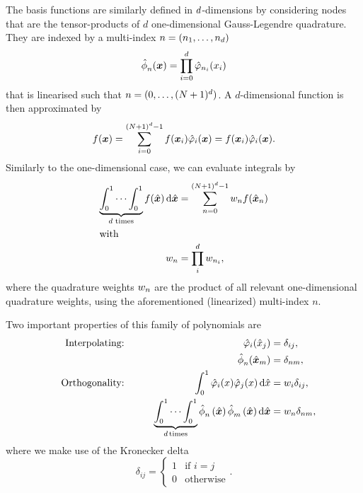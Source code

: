 The basis functions are similarly defined in $\dimensions$-dimensions by considering nodes that are the tensor-products of $d$ one-dimensional Gauss-Legendre quadrature.
They are indexed by a multi-index $n = (n_1, \ldots, n_\dimensions)$
\begin{equation}
  \label{eq:basis-space}
  \sbasisRef[][n] (\bm{x}) = \prod_{i=0}^{\dimensions} \lagrangeRef[n_i] (x_i)
\end{equation}
that is linearised such that $n = (0, \ldots, \sbasisSize)$.
A $d$-dimensional function is then approximated by
\begin{equation}
  \label{eq:lagrange-expansion}
  f(\bm{x}) = \sum_{i = 0}^{\sbasisSize - 1} f(\bm{x}_i) \lagrangeRef[i](\bm{x}) = f(\bm{x}_i) \lagrangeRef[i](\bm{x}).
\end{equation}
Similarly to the one-dimensional case, we can evaluate integrals by
\begin{align}
  \label{eq:quadrature}
  \underbrace{\int_0^1 \cdots \int_0^1}_{\dimensions \text{ times}} f(\hat{\bm{x}}) \dd{\hat{\bm{x}}} &=
 \sum_{n=0}^{\sbasisSize-1} \quadWeight[n] f(\quadNodeNd[n]) \\
  \intertext{with}
  \quadWeight[n] &= \prod_{i}^{d} \quadWeight[n_i],
\end{align}
where the quadrature weights $\quadWeight[n]$ are the product of all relevant one-dimensional quadrature weights, using the aforementioned (linearized) multi-index $n$.

Two important properties of this family of polynomials are
  \begin{alignat}{10}
    \label{eq:basis-interpolating}
&& \text{Interpolating:} \qquad && \lagrangeRef[i] (\quadNode[j]) &= \delta_{ij},\\
&& \qquad && \sbasisRef[][n] (\quadNodeNd[m]) &= \delta_{nm}, \notag\\
\label{eq:basis-orthogonality}
&& \text{Orthogonality:} \qquad && \int_0^1 \lagrangeRef[i](x) \lagrangeRef[j](x) \dd{\hat{x}} &= \quadWeight[i] \delta_{ij},\\
&& \qquad &&
\underbrace{\int_0^1 \cdots \int_0^1}_{d \,\text{times}}
\sbasisRef[][n] \left( \hat{\bm{x}} \right)
\sbasisRef[][m] \left( \hat{\bm{x}} \right) \dd{\hat{\bm{x}}}
&= \quadWeight[n] \delta_{nm}, \notag
    \end{alignat}
    where we make use of the Kronecker delta
\begin{equation}
      \label{eq:kronecker-delta}
      \delta_{ij} =
      \begin{cases}
        1 & \text{if } i = j\\
        0 & \text{otherwise}
      \end{cases}.
\end{equation}

